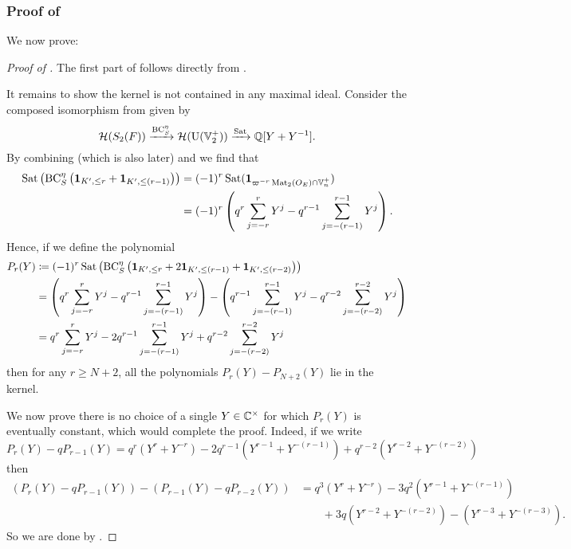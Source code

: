 \subsubsection{Proof of }
We now prove:
\semiliekerlarge*

\begin{proof}[Proof of ]
The first part of  follows directly from
.

It remains to show the kernel is not contained in any maximal ideal.
Consider the composed isomorphism from 
given by
\[ \mathcal H(S_2(F)) \xrightarrow{\operatorname{BC}^\eta_S} \mathcal H(\operatorname{U}(\mathbb V_2^+)) \xrightarrow{\operatorname{Sat}} \mathbb Q[Y + Y^{-1}]. \]
By combining \cite[Equation (7.1.9)]{ref:AFLspherical}
(which is also  later)
and \cite[Equation (7.1.4)]{ref:AFLspherical}
we find that
\begin{align*}
  \operatorname{Sat}\left(\operatorname{BC}^\eta_S\left(\mathbf{1}_{K', \le r} + \mathbf{1}_{K', \le (r-1)}\right)\right)
  &= (-1)^r \operatorname{Sat}(\mathbf{1}_{\varpi^{-r} \operatorname{Mat}_2(O_E) \cap \mathbb V_n^+}) \\
  &= (-1)^r \left( q^r \sum_{j=-r}^r Y^j - q^{r-1} \sum_{j=-(r-1)}^{r-1} Y^j \right).
\end{align*}
Hence, if we define the polynomial
\begin{align*}
  P_r(Y) &\coloneqq (-1)^r \operatorname{Sat}\left(\operatorname{BC}^\eta_S\left(
    \mathbf{1}_{K', \le r} + 2\mathbf{1}_{K', \le (r-1)}
    + \mathbf{1}_{K', \le (r-2)} \right)\right) \\
  &= \left( q^r \sum_{j=-r}^r Y^j - q^{r-1} \sum_{j=-(r-1)}^{r-1} Y^j \right)
    - \left( q^{r-1} \sum_{j=-(r-1)}^{r-1} Y^j - q^{r-2} \sum_{j=-(r-2)}^{r-2} Y^j \right) \\
  &= q^r \sum_{j=-r}^r Y^j - 2q^{r-1} \sum_{j=-(r-1)}^{r-1} Y^j + q^{r-2} \sum_{j=-(r-2)}^{r-2} Y^j
\end{align*}
then for any $r \ge N+2$,
all the polynomials $P_r(Y) - P_{N+2}(Y)$ lie in the kernel.

We now prove there is no choice of a single $Y \in \mathbb C^\times$ for which
$P_r(Y)$ is eventually constant, which would complete the proof.
Indeed, if we write
\[
  P_r(Y) - q P_{r-1}(Y)
  = q^r(Y^r + Y^{-r}) - 2q^{r-1} (Y^{r-1} + Y^{-(r-1)}) + q^{r-2}(Y^{r-2} + Y^{-(r-2)})
\]
then
\begin{align*}
  (P_r(Y) - q P_{r-1}(Y)) - (P_{r-1}(Y) - q P_{r-2}(Y))
  &= q^3(Y^r + Y^{-r}) - 3q^2(Y^{r-1} + Y^{-(r-1)}) \\
  &\qquad + 3q(Y^{r-2} + Y^{-(r-2)}) - (Y^{r-3} + Y^{-(r-3)}).
\end{align*}
So we are done by .
\end{proof}

